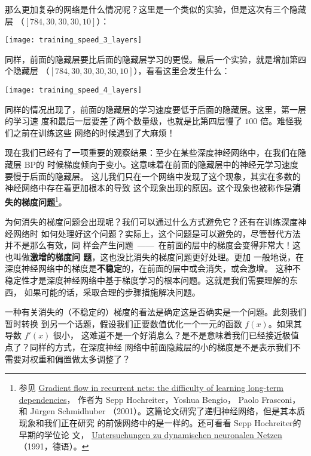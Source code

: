 那么更加复杂的网络是什么情况呢？这里是一个类似的实验，但是这次有三个隐藏层
（$[784, 30, 30, 30, 10]$）：
\begin{center}
  \texttt{[image: training\_speed\_3\_layers]}
\end{center}
 
同样，前面的隐藏层要比后面的隐藏层学习的更慢。最后一个实验，就是增加第四个隐藏层
（$[784, 30, 30, 30, 30, 10]$），看看这里会发生什么：
\begin{center}
  \texttt{[image: training\_speed\_4\_layers]}
\end{center}
 
同样的情况出现了，前面的隐藏层的学习速度要低于后面的隐藏层。这里，第一层的学习速
度和最后一层要差了两个数量级，也就是比第四层慢了 $100$ 倍。难怪我们之前在训练这些
网络的时候遇到了大麻烦！
 
现在我们已经有了一项重要的观察结果：至少在某些深度神经网络中，在我们在隐藏层 BP的
时候梯度倾向于变小。这意味着在前面的隐藏层中的神经元学习速度要慢于后面的隐藏层。
这儿我们只在一个网络中发现了这个现象，其实在多数的神经网络中存在着更加根本的导致
这个现象出现的原因。这个现象也被称作是\textbf{消失的梯度问题}\footnote{参见
  \href{http://citeseerx.ist.psu.edu/viewdoc/summary?doi=10.1.1.24.7321}{Gradient
    flow in recurrent nets: the difficulty of learning long-term dependencies}，
  作者为 Sepp Hochreiter，Yoshua Bengio， Paolo Frasconi， 和 Jürgen
  Schmidhuber （2001）。这篇论文研究了递归神经网络，但是其本质现象和我们正在研究
  的前馈网络中的是一样的。还可看看 Sepp Hochreiter的早期的学位论
  文，
  \href{http://www.idsia.ch/~juergen/SeppHochreiter1991ThesisAdvisorSchmidhuber.pdf}{Untersuchungen
    zu dynamischen neuronalen Netzen} （1991，德语）。}。
 
为何消失的梯度问题会出现呢？我们可以通过什么方式避免它？还有在训练深度神经网络时
如何处理好这个问题？实际上，这个问题是可以避免的，尽管替代方法并不是那么有效，同
样会产生问题~——~在前面的层中的梯度会变得非常大！这也叫做\textbf{激增的梯度问
  题}，这也没比消失的梯度问题更好处理。更加
一般地说，在深度神经网络中的梯度是\textbf{不稳定}的，在前面的层中或会消失，或会激增。
这种不稳定性才是深度神经网络中基于梯度学习的根本问题。这就是我们需要理解的东西，
如果可能的话，采取合理的步骤措施解决问题。
 
一种有关消失的（不稳定的）梯度的看法是确定这是否确实是一个问题。此刻我们暂时转换
到另一个话题，假设我们正要数值优化一个一元的函数 $f(x)$。如果其导数 $f'(x)$ 很小，
这难道不是一个好消息么？是不是意味着我们已经接近极值点了？同样的方式，在深度神经
网络中前面隐藏层的小的梯度是不是表示我们不需要对权重和偏置做太多调整了？
 
